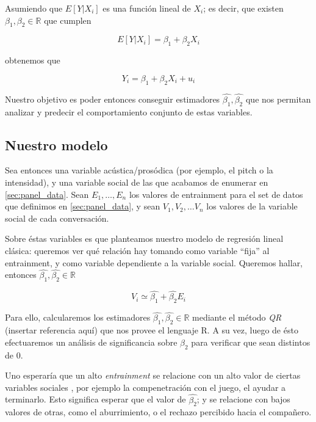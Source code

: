 Asumiendo que $E[Y|X_i]$ es una función lineal de $X_i$; es decir, que existen $\beta_1, \beta_2 \in \mathbb{R}$ que cumplen

\begin{equation}
  E[Y|X_i] = \beta_1 + \beta_2 X_i
\end{equation}

obtenemos que

\begin{equation}
  Y_i = \beta_1 + \beta_2 X_i + u_i
\end{equation}

Nuestro objetivo es poder entonces conseguir estimadores $\widehat{\beta_1}, \widehat{\beta_2}$ que nos permitan analizar y predecir el comportamiento conjunto de estas variables.

\subsection{Nuestro modelo}

Sea entonces una variable acústica/prosódica (por ejemplo, el pitch o la intensidad), y una variable social de las que acabamos de enumerar en \ref{sec:panel_data}. Sean $E_1, \ldots, E_n$ los valores de entrainment para el set de datos que definimos en \ref{sec:panel_data}, y sean $V_1, V_2, \ldots V_n$ los valores de la variable social de cada conversación.

Sobre éstas variables es que planteamos nuestro modelo de regresión lineal clásica: queremos ver qué relación hay tomando como variable ``fija'' al entrainment, y como variable dependiente a la variable social. Queremos hallar, entonces $\widehat{\beta_1}, \widehat{\beta_2} \in \mathbb{R}$

\begin{equation}
  V_i \simeq \widehat{\beta_1} + \widehat{\beta_2} E_i
\end{equation}


Para ello, calcularemos los estimadores $\widehat{\beta_1}, \widehat{\beta_2} \in \mathbb{R}$ mediante el método \emph{QR} (insertar referencia aquí) que nos provee el lenguaje R. A su vez, luego de ésto efectuaremos un análisis de significancia sobre $\beta_2$ para verificar que sean distintos de 0.


Uno esperaría que un alto \emph{entrainment} se relacione con un alto valor de ciertas variables sociales \cite{BRE1996}, por ejemplo la compenetración con el juego, el ayudar a terminarlo. Esto significa esperar que el valor de $\widehat{\beta_2}$; y se relacione con bajos valores de otras, como el aburrimiento, o el rechazo percibido hacia el compañero.




